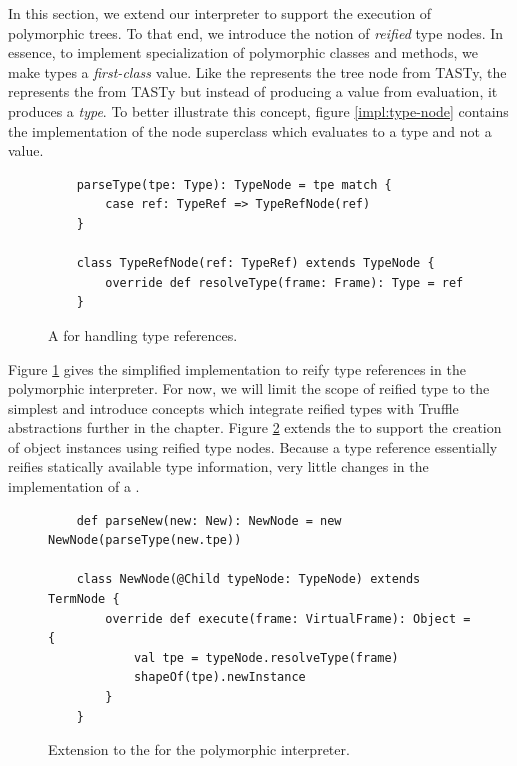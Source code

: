 In this section, we extend our interpreter to support the execution of polymorphic trees.
To that end, we introduce the notion of \textit{reified} type nodes.
In essence, to implement specialization of polymorphic classes and methods, we make types a \textit{first-class} value.
Like the  represents the  tree node from TASTy, the  represents the  from TASTy but instead of producing a value from evaluation, it produces a \textit{type}.
To better illustrate this concept, figure \ref{impl:type-node} contains the implementation of the node superclass which evaluates to a type and not a value.

\begin{figure}[!htb]
	\begin{verbatim}
	parseType(tpe: Type): TypeNode = tpe match {
		case ref: TypeRef => TypeRefNode(ref)
	}

	class TypeRefNode(ref: TypeRef) extends TypeNode {
		override def resolveType(frame: Frame): Type = ref
	}
	\end{verbatim}
	\caption{A  for handling type references.}
	\label{impl:parse-type}
\end{figure}

Figure \ref{impl:parse-type} gives the simplified implementation to reify type references in the polymorphic interpreter.
For now, we will limit the scope of reified type to the simplest and introduce concepts which integrate reified types with Truffle abstractions further in the chapter.
Figure \ref{impl:extend-new} extends the  to support the creation of object instances using reified type nodes.
Because a type reference essentially reifies statically available type information, very little changes in the implementation of a .

\begin{figure}[!htb]
	\begin{verbatim}
	def parseNew(new: New): NewNode = new NewNode(parseType(new.tpe))	
	
	class NewNode(@Child typeNode: TypeNode) extends TermNode {
		override def execute(frame: VirtualFrame): Object = {
			val tpe = typeNode.resolveType(frame)
			shapeOf(tpe).newInstance
		}
	}
	\end{verbatim}
	\caption{Extension to the  for the polymorphic interpreter.}
	\label{impl:extend-new}
\end{figure}

